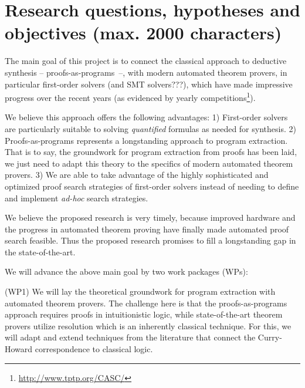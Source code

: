 \documentclass[a4paper,12pt]{article}
\begin{document}
\section{Research questions, hypotheses and objectives (max. 2000 characters)}

The main goal of this project is to connect the classical approach to deductive synthesis --  proofs-as-programs~\cite{?}--, with modern automated theorem provers, in particular first-order solvers (and SMT solvers???), which have made impressive progress over the recent years (as evidenced by yearly competitions\footnote{\url{http://www.tptp.org/CASC/}}).

We believe this approach offers the following advantages:
1) First-order solvers are particularly suitable to solving \emph{quantified} formulas as needed for synthesis.
2) Proofs-as-programs represents a longstanding approach to program extraction.
That is to say, the groundwork for program extraction from proofs has been laid, we just need to adapt this theory to the specifics of modern automated theorem provers.
3) We are able to take advantage of the highly sophisticated and optimized proof search strategies of first-order solvers instead of needing to define and implement \emph{ad-hoc} search strategies.

We believe the proposed research is very timely, because improved hardware and the progress in automated theorem proving have finally made automated proof search feasible.
Thus the proposed research promises to fill a longstanding gap in the state-of-the-art.

We will advance the above main goal by two work packages (WPs):

(WP1) We will lay the theoretical groundwork for program extraction with automated theorem provers.
The challenge here is that the proofs-as-programs approach requires proofs in intuitionistic logic, while state-of-the-art theorem provers
utilize resolution which is an inherently classical technique.
For this, we will adapt and extend techniques from the literature that connect the Curry-Howard correspondence to classical logic.
\end{document}
